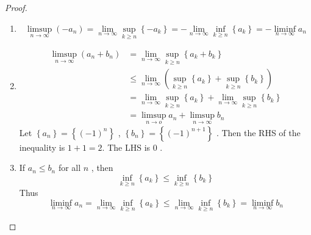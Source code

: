 \documentclass[../main.tex]{subfiles}
\begin{document}
\begin{proof}
   \begin{enumerate}
    \item  \[
    \limsup_{n\to \infty}\left( -a_{n} \right)= \lim_{n\to \infty}  \sup _{k\ge n}\left\{ -a_{k} \right\}= -\lim_{n\to \infty} \inf _{k\ge n} \left\{ a_{k} \right\}= -\liminf_{n\to \infty}a_{n} 
    \]
    \item \[
    \begin{aligned}
    \limsup_{n\to \infty} \left( a_{n}+ b_{n} \right)&= \lim_{n\to \infty}  \sup _{k\ge n}\left\{ a_{k}+ b_{k} \right\}\\ 
     &\le \lim_{n\to \infty} \left( \sup _{k\ge n}\left\{ a_{k} \right\}+ \sup _{k\ge n}\left\{ b_{k} \right\} \right)\\ 
      &=\lim_{n\to \infty}\sup _{k\ge n}\left\{ a_{k} \right\}+ \lim_{n\to \infty}\sup _{k\ge n}\left\{ b_{k} \right\}\\ 
       &=  \limsup_{n\to o}a_{n}+ \limsup_{n\to \infty}b_{n}
    \end{aligned}
    \] Let \(  \left\{ a_{n} \right\}= \left\{ \left( -1 \right)^{n}   \right\}  \) , \(  \left\{ b_{n} \right\}= \left\{ \left( -1 \right)^{n+ 1}   \right\}  \) .  Then the RHS of the inequality is \(  1+ 1= 2  \).  The LHS is  \(  0  \) .   
    \item If \(  a_{n} \le b_{n}  \) for all \(  n  \) , then  \[
    \inf _{k\ge n}\left\{ a_{k} \right\}\le \inf _{k\ge n}\left\{ b_{k} \right\}
    \]  Thus \[
    \liminf_{n\to \infty}a_{n}= \lim_{n\to \infty} \inf _{k\ge n}\left\{ a_{k} \right\}\le  \lim_{n\to \infty} \inf _{k\ge n}\left\{ b_{k} \right\}= \liminf_{n\to \infty}b_{n}
    \]
   \end{enumerate}
   
\end{proof}
\end{document}
